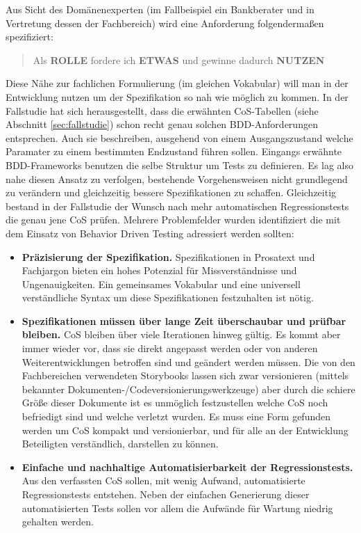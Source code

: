 Aus Sicht des Domänenexperten (im Fallbeispiel ein Bankberater und in Vertretung dessen der Fachbereich) wird eine Anforderung folgendermaßen spezifiziert: 

\begin{quote}Als \textbf{ROLLE} fordere ich \textbf{ETWAS} und gewinne dadurch \textbf{NUTZEN} \cite{north_official_2015}\end{quote}

Diese Nähe zur fachlichen Formulierung (im gleichen Vokabular) will man in der Entwicklung nutzen um der Spezifikation so nah wie möglich zu kommen. In der Fallstudie hat sich herausgestellt, dass die erwähnten CoS-Tabellen (siehe Abschnitt \ref{sec:fallstudie}) schon recht genau solchen \Gls{BDD}-Anforderungen entsprechen. Auch sie beschreiben, ausgehend von einem Ausgangszustand welche Paramater zu einem bestimmten Endzustand führen sollen. Eingangs erwähnte \Gls{BDD}-Frameworks benutzen die selbe Struktur um Tests zu definieren. Es lag also nahe diesen Ansatz zu verfolgen, bestehende Vorgehensweisen nicht grundlegend zu verändern und gleichzeitig bessere Spezifikationen zu schaffen. Gleichzeitig bestand in der Fallstudie der Wunsch nach mehr automatischen Regressionstests die genau jene \Gls{CoS} prüfen. Mehrere Problemfelder wurden identifiziert die mit dem Einsatz von Behavior Driven Testing adressiert werden sollten:


\begin{itemize}
\item \textbf{Präzisierung der Spezifikation.} Spezifikationen in Prosatext und Fachjargon bieten ein hohes Potenzial für Missverständnisse und Ungenauigkeiten. Ein gemeinsames Vokabular und eine universell verständliche Syntax um diese Spezifikationen festzuhalten ist nötig.
\item \textbf{Spezifikationen müssen über lange Zeit überschaubar und prüfbar bleiben.} \Gls{CoS} bleiben über viele Iterationen hinweg gültig. Es kommt aber immer wieder vor, dass sie direkt angepasst werden oder von anderen Weiterentwicklungen betroffen sind und geändert werden müssen. Die von den Fachbereichen verwendeten Storybooks lassen sich zwar versionieren (mittels bekannter Dokumenten-/Codeversionierungswerkzeuge) aber durch die schiere Größe dieser Dokumente ist es unmöglich festzustellen welche CoS noch befriedigt sind und welche verletzt wurden. Es muss eine Form gefunden werden um CoS kompakt und versionierbar, und für alle an der Entwicklung Beteiligten verständlich, darstellen zu können.
\item \textbf{Einfache und nachhaltige Automatisierbarkeit der Regressionstests.} Aus den verfassten CoS sollen, mit wenig Aufwand, automatisierte Regressionstests entstehen. Neben der einfachen Generierung dieser automatisierten Tests sollen vor allem die Aufwände für Wartung niedrig gehalten werden.
\end{itemize}


